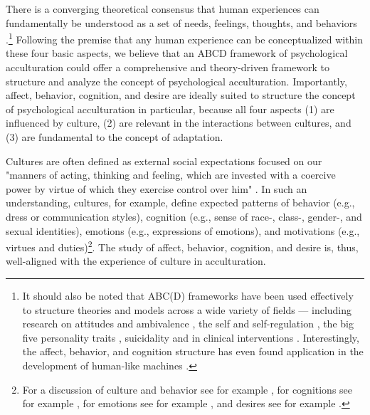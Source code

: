 \documentclass[man, 12pt, a4paper, mask]{apa7}
\begin{document}
There is a converging theoretical consensus that human experiences can fundamentally be understood as a set of needs, feelings, thoughts, and behaviors \citep[sometimes referred to as the ABCs or ABCDs of psychology: affect, behavior, cognition, desire; e.g.,][]{Cottam2010, Hogg2005, Jhangiani2014}.\footnote{It should also be noted that ABC(D) frameworks have been used effectively to structure theories and models across a wide variety of fields --- including research on attitudes \citep{Breckler1984} and ambivalence \citep{VanHarreveld2015}, the self \citep{Cote2009} and self-regulation \citep{Ben-Eliyahu2015}, the big five personality traits \citep{Wilt2016}, suicidality \citep{Harris2015} and in clinical interventions \citep{Eifert1989}. Interestingly, the affect, behavior, and cognition structure has even found application in the development of human-like machines \citep{Guo2020}.} Following the premise that any human experience can be conceptualized within these four basic aspects, we believe that an ABCD framework of psychological acculturation could offer a comprehensive and theory-driven framework to structure and analyze the concept of psychological acculturation. Importantly, affect, behavior, cognition, and desire are ideally suited to structure the concept of psychological acculturation in particular, because all four aspects (1) are influenced by culture, (2) are relevant in the interactions between cultures, and (3) are fundamental to the concept of adaptation.

Cultures are often defined as external social expectations focused on our "manners of acting, thinking and feeling, which are invested with a coercive power by virtue of which they exercise control over him" \citep[][p. 52; on social facts]{Durkheim1982, Gilbert1989}. In such an understanding, cultures, for example, define expected patterns of behavior (e.g., dress or communication styles), cognition (e.g., sense of race-, class-, gender-, and sexual identities), emotions (e.g., expressions of emotions), and motivations (e.g., virtues and duties)\footnote{For a discussion of culture and behavior see for example \citet[][]{Legare2019, Whiting1980}, for cognitions see for example \citet[][]{Gelfand2011, Nisbett2002}, for emotions see for example \citet[][]{Holodynski2012, Boiger2018}, and desires see for example \citet[][]{McInerney2016, Morling2017}.}. The study of affect, behavior, cognition, and desire is, thus, well-aligned with the experience of culture in acculturation.
\end{document}
